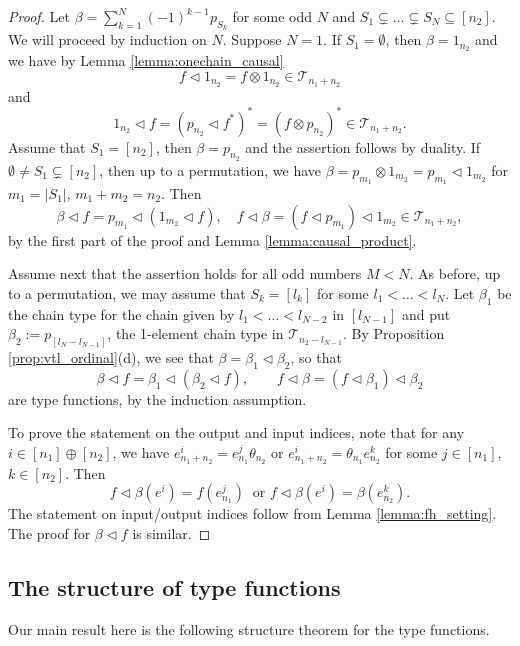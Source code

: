 \documentclass[12pt]{article}
\theoremstyle{definition}
\theoremstyle{remark}
\def\Te{\mathcal T}
\def\vtl{\vartriangleleft}
\begin{document}
\begin{proof} Let  $\beta=\sum_{k=1}^{N}(-1)^{k-1}p_{S_k}$
for some odd $N$ and $S_1\subsetneq \dots \subsetneq S_N\subseteq [n_2]$. We will proceed
by induction on $N$. Suppose $N=1$. If $S_1=\emptyset$,
then $\beta=1_{n_2}$ and we have by Lemma \ref{lemma:onechain_causal}
\[
f\vtl 1_{n_2}=f\otimes 1_{n_2}\in \Te_{n_1+n_2}
\]
and
\[
1_{n_2}\vtl f=(p_{n_2}\vtl f^*)^*=(f\otimes p_{n_2})^*\in \Te_{n_1+n_2}.
\]
Assume that  $S_1=[n_2]$, then $\beta=p_{n_2}$ and the assertion follows by duality. 
If $\emptyset\ne S_1\subsetneq [n_2]$, then up to a permutation, we have $\beta=p_{m_1}\otimes
1_{m_2}=p_{m_1}\vtl 1_{m_2}$ for $m_1=|S_1|$, $m_1+m_2=n_2$. Then 
\[
\beta\vtl f=p_{m_1}\vtl (1_{m_2}\vtl f),\quad f\vtl \beta=(f\vtl p_{m_1})\vtl 1_{m_2} \in
\Te_{n_1+n_2},
\]
by the first part of the proof and Lemma \ref{lemma:causal_product}.

Assume next that the assertion holds for all odd numbers $M<N$. As before, up to a
permutation, we may assume that $S_k=[l_k]$ for some $l_1<\dots<l_{N}$. Let $\beta_1$ be the chain
type for the chain given by $l_1<\dots<l_{N-2}$ in $[l_{N-1}]$ and put
$\beta_2:=p_{[l_{N}-l_{N-1}]}$, the 1-element chain type in $\Te_{n_2-l_{N-1}}$. By
Proposition \ref{prop:vtl_ordinal}(d), we see
that $\beta=\beta_1\vtl\beta_2$, so that 
\[
\beta\vtl f=\beta_1\vtl(\beta_2\vtl f),\qquad f\vtl\beta=(f\vtl\beta_1)\vtl\beta_2
\]
are type functions, by the induction assumption. 


To prove the statement on the output and input indices, note that for any $i\in [n_1]\oplus [n_2]$, we have  $e^i_{n_1+n_2}=e^j_{n_1}\theta_{n_2}$ or
$e^i_{n_1+n_2}=\theta_{n_1}e^k_{n_2}$
for some $j\in [n_1]$, $k\in [n_2]$. Then   
\[
f\vtl\beta(e^i)=f(e^j_{n_1})\ \text{ or } f\vtl \beta(e^i)=\beta(e^k_{n_2}).
\]
The statement on input/output indices  follow from Lemma \ref{lemma:fh_setting}. The proof
for $\beta\vtl f$ is similar. 

\end{proof}


\subsection{The structure of type functions}

Our main result here is the  following structure theorem for the type functions.
\end{document}
